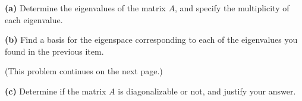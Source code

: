 \documentclass[12pt]{article}
\begin{document}
\textbf{(a)} Determine the eigenvalues of the matrix $A$, and specify the multiplicity of each eigenvalue.

\vskip3in

\textbf{(b)} Find a basis for the eigenspace corresponding to each of the eigenvalues you found in the previous item.

\vfill
(This problem continues on the next page.)
\clearpage

\textbf{(c)} Determine if the matrix $A$ is diagonalizable or not, and justify your answer.
\end{document}
